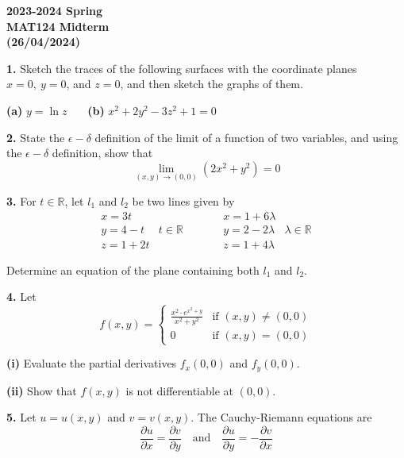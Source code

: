 \documentclass{article}
\begin{document}
\pagestyle{empty}
\large

\begin{center}
\textbf{2023-2024 Spring \\MAT124 Midterm\\(26/04/2024)}
\end{center}

\textbf{1.} Sketch the traces of the following surfaces with the coordinate planes $x=0,\:y=0$, and $z=0$, and then sketch the graphs of them.

\textbf{(a)} $y=\ln z$ \ \ \ \textbf{(b)} $x^2+2y^2-3z^2+1=0$

\vspace{1em}

\textbf{2.} State the $\epsilon-\delta$ definition of the limit of a function of two variables, and using the $\epsilon-\delta$ definition, show that
\[\lim_{(x,y)\to(0,0)}\left(2x^2+y^2\right)=0\]

\vspace{1em}

\textbf{3.} For $t\in\mathbb{R}$, let $l_1$ and $l_2$ be two lines given by
\[\begin{array}{ccccc}
x=3t&&&x=1+6\lambda&\\
y=4-t&t\in\mathbb{R}&& y=2-2\lambda&\lambda\in\mathbb{R}\\
z=1+2t&&\qquad&z=1+4\lambda&
\end{array}\]

Determine an equation of the plane containing both $l_1$ and $l_2$.

\vspace{1em}

\textbf{4.} Let
\[f(x,y)=\left\{\begin{array}{cc}
\displaystyle\frac{x^2\cdot{e}^{x^2+y}}{x^2+y^2}&\text{if }(x,y)\neq(0,0)\\[1em]
0&\text{if }(x,y)=(0,0)
\end{array}\right.\]

\textbf{(i)} Evaluate the partial derivatives $f_x(0,0)$ and $f_y(0,0)$.

\textbf{(ii)} Show that $f(x,y)$ is not differentiable at $(0,0)$.

\vspace{1em}

\textbf{5.} Let $u=u(x,y)$ and $v=v(x,y)$. The Cauchy-Riemann equations are
\[\frac{\partial u}{\partial x}=\frac{\partial v}{\partial y}\quad\text{and}\quad\frac{\partial u}{\partial y}=-\frac{\partial v}{\partial x}\]
\end{document}
